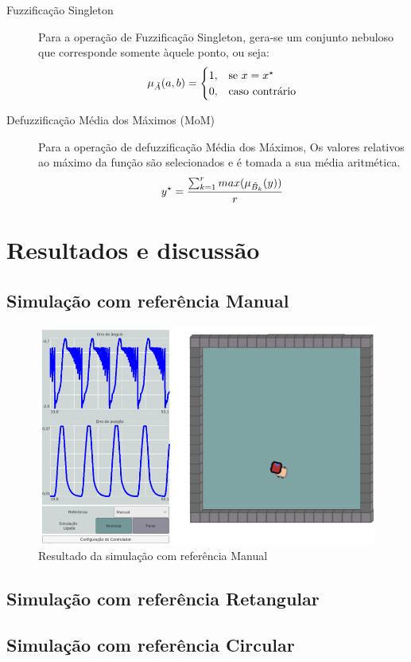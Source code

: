\begin{description}
                \item [Fuzzificação Singleton] Para a operação de Fuzzificação Singleton, gera-se um conjunto nebuloso que corresponde somente àquele ponto, ou seja:
                \begin{equation*}
                    \mu_{\tilde{A}}(a,b)=
                     \begin{cases}
                        1, & \text{se \textbf{$x=x^{\star}$}}\\
                        0, & \text{caso contrário}
                    \end{cases}      
                \end{equation*}
                \item [Defuzzificação Média dos Máximos (MoM)] Para a operação de defuzzificação Média dos Máximos, Os valores relativos ao máximo da função são selecionados e é tomada a sua média aritmética.
                \begin{equation*}
                    y^{\star}= \frac{\sum_{k=1}^{r} max(\mu_{\tilde{B}_k}(y))}{r}\\
                \end{equation*}
            \end{description}

\section{Resultados e discussão}

    \subsection{Simulação com referência Manual}

        \begin{figure}[H] 
            \centering
            \includegraphics[scale=0.7]{imagens/cont_carrinho_erro_manual_final.png}
            \caption{Resultado da simulação com referência Manual}
        \end{figure}

    \subsection{Simulação com referência Retangular}

    \subsection{Simulação com referência Circular}